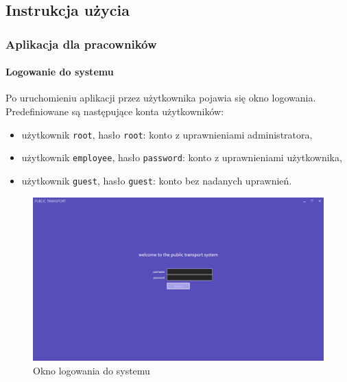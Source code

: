 \documentclass[10pt,a4paper]{article}
\begin{document}
\subsection{Instrukcja użycia}

\subsubsection{Aplikacja dla pracowników}

\paragraph{Logowanie do systemu}
Po uruchomieniu aplikacji przez użytkownika pojawia się okno logowania. Predefiniowane są następujące konta użytkowników:
\begin{itemize}
	\item użytkownik \texttt{root}, hasło \texttt{root}: konto z uprawnieniami administratora,
	\item użytkownik \texttt{employee}, hasło \texttt{password}: konto z uprawnieniami użytkownika,
	\item użytkownik \texttt{guest}, hasło \texttt{guest}: konto bez nadanych uprawnień.
\end{itemize}
\begin{figure}[H]
	\centering
	\includegraphics[width=15cm]{Resources/Images/01_login_screen.png}
	\caption{Okno logowania do systemu}
\end{figure}
\end{document}
